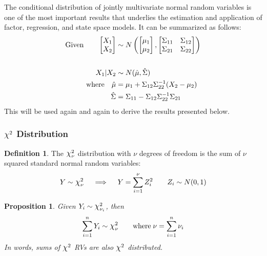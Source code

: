 \documentclass[12pt]{article}
\theoremstyle{plain}
\newtheorem{prop}[thm]{Proposition}
\theoremstyle{definition}
\newtheorem{defn}[thm]{Definition}
\theoremstyle{remark}
\newcommand*{\Chi}{\mbox{\large$\chi$}} %
\begin{document}
The conditional distribution of jointly multivariate normal random
variables is one of the most important results that underlies the
estimation and application of factor, regression, and state space
models. It can be summarized as follows:
\begin{align}
  \text{Given} \qquad
    \begin{bmatrix} X_1 \\ X_2 \end{bmatrix}
    &\sim
    N\left(
    \begin{bmatrix} \mu_1 \\ \mu_2 \end{bmatrix},
    \begin{bmatrix}
      \Sigma_{11} & \Sigma_{12} \\
      \Sigma_{21} & \Sigma_{22}
    \end{bmatrix}
    \right) \notag\\
    \label{reg} \\
  X_1 | X_2 &\sim N(\hat{\mu}, \hat{\Sigma})  \notag\\
  \text{where} \quad
  \hat{\mu} &= \mu_1 + \Sigma_{12} \Sigma^{-1}_{22}
    (X_2-\mu_2) \notag\\
  \hat{\Sigma} &= \Sigma_{11} - \Sigma_{12} \Sigma^{-1}_{22}
    \Sigma_{21}\notag
\end{align}
This will be used again and again to derive the results presented below.


\clearpage
\subsubsection{$\Chi^2$ Distribution}


\begin{defn}
The $\Chi^2_\nu$ distribution with $\nu$ degrees of freedom is the sum of
$\nu$ squared standard normal random variables:
\begin{align*}
  Y \sim \Chi^2_\nu
  \quad\implies\quad
	 Y = \sum^\nu_{i=1} Z^2_i
   \qquad Z_i \sim N(0,1)
\end{align*}
\end{defn}

\begin{prop}
\label{prop:chisum}
Given $Y_i \sim \Chi_{\nu_i}^2$, then
\begin{align*}
  \sum^n_{i=1} Y_i \sim \Chi^2_{\nu}
  \qquad
  \text{where}\;
  \nu=\sum^n_{i=1} \nu_i
\end{align*}
In words, sums of $\Chi^2$ RVs are also $\Chi^2$ distributed.
\end{prop}
\end{document}
